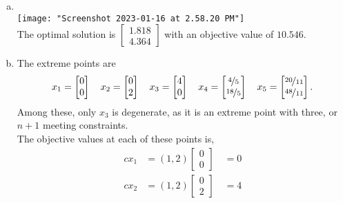 \documentclass[12pt]{amsart}
\begin{document}
\begin{enumerate}[a.]
	\item \phantom{text} \\	
	\texttt{[image: "Screenshot 2023-01-16 at 2.58.20 PM"]} \\
	
	The optimal solution is \(\begin{bmatrix} 1.818 \\ 4.364 \end{bmatrix}\)
	with an objective value of \(10.546\).
	\item 
	The extreme points are
	\begin{align*}
		x_1 = \begin{bmatrix} 0 \\ 0 \end{bmatrix} \quad
		x_2 = \begin{bmatrix} 0 \\ 2 \end{bmatrix} \quad
		x_3 = \begin{bmatrix} 4 \\ 0 \end{bmatrix} \quad
		x_4 = \begin{bmatrix} \nicefrac{4}{5} \\ \nicefrac{18}{5} \end{bmatrix} \quad
		x_5 = \begin{bmatrix} \nicefrac{20}{11}\\ \nicefrac{48}{11} \end{bmatrix}.
	\end{align*}
	Among these, only \(x_3\) is degenerate, as it is an extreme point with three, or \(n+1\) meeting constraints. \\
	The objective values at each of these points is,
	\begin{align*}
		cx_1 &= (1,2)\begin{bmatrix} 0 \\ 0 \end{bmatrix} \quad  = 0 \\
		cx_2 &= (1,2)\begin{bmatrix} 0 \\ 2 \end{bmatrix} \quad  = 4 \\

\end{align*}
\end{enumerate}
\end{document}
